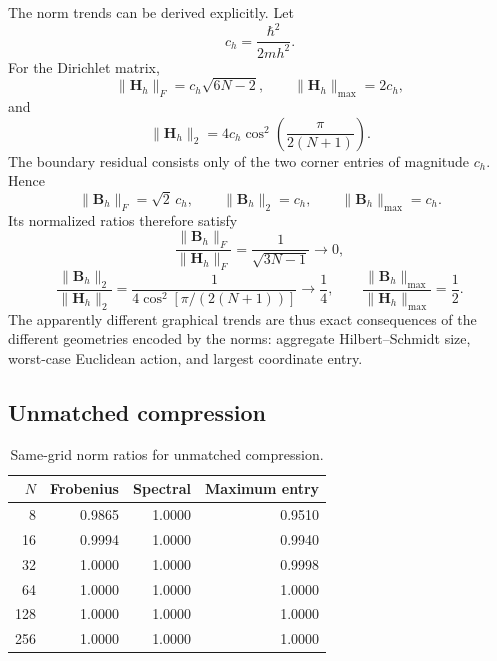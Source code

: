 \documentclass[11pt]{article}
\begin{document}
The norm trends can be derived explicitly. Let
\begin{equation}
  c_h=\frac{\hbar^2}{2mh^2}.
\end{equation}
For the Dirichlet matrix,
\begin{equation}
  \|\mathbf H_h\|_F=c_h\sqrt{6N-2},
  \qquad
  \|\mathbf H_h\|_{\max}=2c_h,
\end{equation}
and
\begin{equation}
  \|\mathbf H_h\|_2
  =4c_h\cos^2\!\left(\frac{\pi}{2(N+1)}\right).
\end{equation}
The boundary residual consists only of the two corner entries of magnitude
$c_h$. Hence
\begin{equation}
  \|\mathbf B_h\|_F=\sqrt{2}\,c_h,
  \qquad
  \|\mathbf B_h\|_2=c_h,
  \qquad
  \|\mathbf B_h\|_{\max}=c_h.
\end{equation}
Its normalized ratios therefore satisfy
\begin{equation}
  \frac{\|\mathbf B_h\|_F}{\|\mathbf H_h\|_F}
  =\frac{1}{\sqrt{3N-1}}\longrightarrow0,
\end{equation}
\begin{equation}
  \frac{\|\mathbf B_h\|_2}{\|\mathbf H_h\|_2}
  =\frac{1}{4\cos^2[\pi/(2(N+1))]}\longrightarrow\frac14,
  \qquad
  \frac{\|\mathbf B_h\|_{\max}}{\|\mathbf H_h\|_{\max}}=\frac12.
\end{equation}
The apparently different graphical trends are thus exact consequences of the
different geometries encoded by the norms: aggregate Hilbert--Schmidt size,
worst-case Euclidean action, and largest coordinate entry.

\subsection{Unmatched compression}

\begin{table}[htbp]
\centering
\caption{Same-grid norm ratios for unmatched compression.}
\begin{tabular}{rrrr}
\toprule
$N$ & Frobenius & Spectral & Maximum entry\\
\midrule
8   & 0.9865 & 1.0000 & 0.9510\\
16  & 0.9994 & 1.0000 & 0.9940\\
32  & 1.0000 & 1.0000 & 0.9998\\
64  & 1.0000 & 1.0000 & 1.0000\\
128 & 1.0000 & 1.0000 & 1.0000\\
256 & 1.0000 & 1.0000 & 1.0000\\
\bottomrule
\end{tabular}
\end{table}
\end{document}
